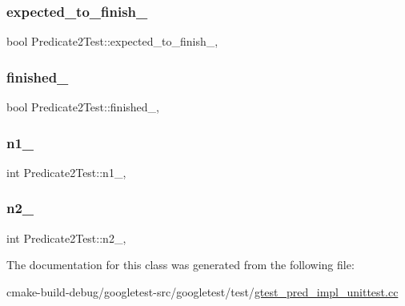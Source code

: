 \subsubsection{\texorpdfstring{expected\_to\_finish\_}{expected\_to\_finish\_}}
{\footnotesize\ttfamily bool Predicate2\+Test\+::expected\+\_\+to\+\_\+finish\+\_\+\hspace{0.3cm}{\ttfamily [static]}, {\ttfamily [protected]}}

\mbox{\label{classPredicate2Test_a30f4ef76d3004253078e767e5c653b85}} 
\subsubsection{\texorpdfstring{finished\_}{finished\_}}
{\footnotesize\ttfamily bool Predicate2\+Test\+::finished\+\_\+\hspace{0.3cm}{\ttfamily [static]}, {\ttfamily [protected]}}

\mbox{\label{classPredicate2Test_ac002d8e279b24e75906fd19973fc2170}} 
\subsubsection{\texorpdfstring{n1\_}{n1\_}}
{\footnotesize\ttfamily int Predicate2\+Test\+::n1\+\_\+\hspace{0.3cm}{\ttfamily [static]}, {\ttfamily [protected]}}

\mbox{\label{classPredicate2Test_a9dbe5173570b9b911af2df889c287027}} 
\subsubsection{\texorpdfstring{n2\_}{n2\_}}
{\footnotesize\ttfamily int Predicate2\+Test\+::n2\+\_\+\hspace{0.3cm}{\ttfamily [static]}, {\ttfamily [protected]}}



The documentation for this class was generated from the following file\+:\begin{DoxyCompactItemize}
\item 
cmake-\/build-\/debug/googletest-\/src/googletest/test/\mbox{\hyperlink{gtest__pred__impl__unittest_8cc}{gtest\+\_\+pred\+\_\+impl\+\_\+unittest.\+cc}}\end{DoxyCompactItemize}
